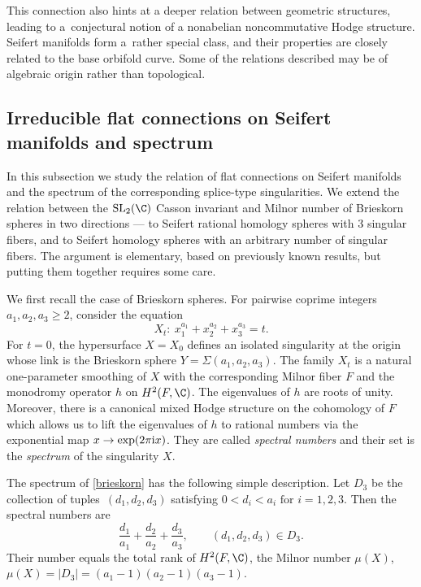 \documentclass[pdftex]{sigma}
\begin{document}
This connection also hints at a deeper relation between geometric structures, leading to a~conjectural notion of a nonabelian noncommutative Hodge structure. Seifert manifolds form a~rather special class, and their properties are closely related to the base orbifold curve. Some of the relations described may be of algebraic origin rather than topological.

\subsection{Irreducible flat connections on Seifert manifolds and spectrum}

In this subsection we study the relation of flat connections on Seifert manifolds and the spectrum of the corresponding splice-type singularities. We extend the relation between the $\operatorname{SL}_2(\C)$ Casson invariant and Milnor number of Brieskorn spheres \cite[equation~(2.9)]{BC06} in two directions --- to Seifert rational homology spheres with 3 singular fibers, and to Seifert homology spheres with an arbitrary number of singular fibers. The argument is elementary, based on previously known results, but putting them together requires some care.

We first recall the case of Brieskorn spheres. For pairwise coprime integers $a_1,a_2,a_3 \geq 2$, consider the equation
\begin{equation}\label{brieskorn}
 X_t\colon\ x_1^{a_1}+x_2^{a_2}+x_3^{a_3}=t.
\end{equation}
For $t=0$, the hypersurface $X=X_0$ defines an isolated singularity at the origin whose link is the Brieskorn sphere $Y = \Sigma(a_1,a_2,a_3)$. The family $X_t$ is a natural one-parameter smoothing of $X$ with the corresponding Milnor fiber $F$ and the monodromy operator $h$ on $H^2(F,\C)$. The eigenvalues of $h$ are roots of unity. Moreover, there is a canonical mixed Hodge structure on the cohomology of $F$ which allows us to lift the eigenvalues of $h$ to rational numbers via the exponential map $x \to \exp(2\pi {\rm i} x)$. They are called \emph{spectral numbers} and their set is the \emph{spectrum} of the singularity $X$.

The spectrum of \eqref{brieskorn} has the following simple description. Let $D_3$ be the collection of tuples~${(d_1,d_2,d_3)}$ satisfying $0<d_i<a_i \text{ for } i = 1, 2, 3$. Then the spectral numbers are
\begin{equation}\label{spec_three}
	\frac{d_1}{a_1} + \frac{d_2}{a_2} + \frac{d_3}{a_3}, \qquad (d_1,d_2,d_3) \in D_3.
\end{equation}
Their number equals the total rank of $H^2(F,\C)$, the Milnor number $\mu(X)$,
$
\mu(X) = |D_3| = (a_1-1)(a_2-1)(a_3-1)$.
\end{document}
